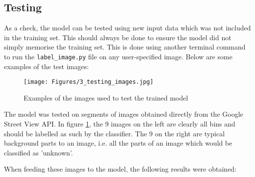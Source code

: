 \subsection{Testing}
As a check, the model can be tested using new input data which was not included in the training set. This should always be done to ensure the model did not simply memorise the training set. This is done using another terminal command to run the \verb|label_image.py| file on any user-specified image. Below are some examples of the test images:

\begin{figure}[H]
\centering
\texttt{[image: Figures/3\_testing\_images.jpg]}
\decoRule
\caption[Testing Images]{Examples of the images used to test the trained model}
\label{fig:testing_images}
\end{figure}

The model was tested on segments of images obtained directly from the Google Street View API. In figure \ref{fig:testing_images}, the 9 images on the left are clearly all bins and should be labelled as such by the classifier. The 9 on the right are typical background parts to an image, i.e. all the parts of an image which would be classified as 'unknown'.

When feeding these images to the model, the following results were obtained:

